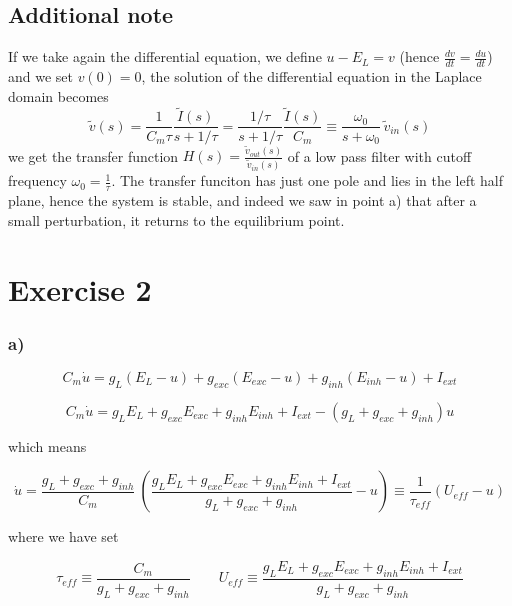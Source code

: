 \documentclass[11pt]{article}
\begin{document}
    \subsection*{Additional note}\label{additional-note}

If we take again the differential equation, we define $u - E_L = v$
(hence $\frac{dv}{dt} = \frac{du}{dt}$) and we set $v(0) = 0$, the
solution of the differential equation in the Laplace domain becomes
\[ \tilde v(s) = \frac{1}{C_m \tau} \frac{\tilde I(s)}{s + 1/\tau} = \frac{1/\tau}{s+1/\tau} \frac{\tilde I(s)}{C_m} \equiv \frac{\omega_0}{s+\omega_0} \, \tilde v_{in}(s)\]
we get the transfer function
$H(s) = \frac{\tilde v_{out}(s)}{\tilde v_{in}(s)}$ of a low pass filter
with cutoff frequency $\omega_0 = \frac{1}{\tau}$. The transfer funciton
has just one pole and lies in the left half plane, hence the system is
stable, and indeed we saw in point a) that after a small perturbation,
it returns to the equilibrium point.

    \section*{Exercise 2}\label{exercise-2}

\subsubsection*{a)}\label{a}

\begin{equation*}
    C_m \dot u = g_L (E_L - u) + g_{exc} (E_{exc} - u) + g_{inh} (E_{inh} - u) + I_{ext}
\end{equation*}

    \begin{equation*}
    C_m \dot u = g_L E_L + g_{exc} E_{exc} + g_{inh} E_{inh} + I_{ext} - \left(g_L + g_{exc} + g_{inh}\right) u
\end{equation*}

which means

\begin{equation*}
    \dot u = \frac{g_L + g_{exc} + g_{inh}}{C_m} \ \left(\frac{g_L E_L + g_{exc} E_{exc} + g_{inh} E_{inh} + I_{ext}}{g_L + g_{exc} + g_{inh}} - u\right) \equiv \frac{1}{\tau_{eff}} \left(U_{eff} - u\right)
\end{equation*}

where we have set

\begin{equation*}
    \tau_{eff} \equiv \frac{C_m}{g_L + g_{exc} + g_{inh}} \qquad U_{eff} \equiv \frac{g_L E_L + g_{exc} E_{exc} + g_{inh} E_{inh} + I_{ext}}{g_L + g_{exc} + g_{inh}}
\end{equation*}
\end{document}
